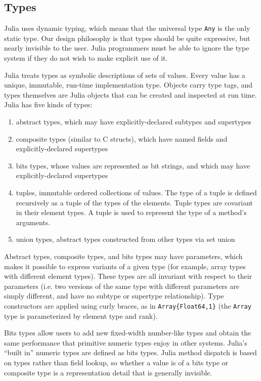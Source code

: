 \documentclass[9pt]{sigplanconf}
\begin{document}
\subsection{Types}

Julia uses dynamic typing, which means that the universal type {\tt Any}
is the only static type. Our design philosophy is that types should be
quite expressive, but nearly invisible to the user. Julia
programmers must be able to ignore the type system if they do
not wish to make explicit use of it.

Julia treats types as symbolic descriptions of sets of values. Every value has
a unique, immutable, run-time implementation type. Objects carry type tags, and
types themselves are Julia objects that can be created and inspected
at run time.
Julia has five kinds of types:

\begin{enumerate}
\item abstract types, which may have explicitly-declared subtypes and supertypes
\item composite types (similar to C structs), which have named fields and
      explicitly-declared supertypes
\item bits types, whose values are represented as bit strings, and which may
      have explicitly-declared supertypes
\item tuples, immutable ordered collections of values. The type of a tuple is
defined recursively as a tuple of the types of the elements. Tuple types are
covariant in their element types. A tuple is used to represent the type of a
method's arguments.
\item union types, abstract types constructed from other types via set union
\end{enumerate}

Abstract types, composite types, and bits types may have parameters, which
makes it possible to express variants of a given type (for example, array types
with different element types). These types are all invariant with respect to
their parameters (i.e. two versions of the same type with different parameters
are simply different, and have no subtype or supertype relationship). Type
constructors are applied using curly braces, as in {\tt Array\{Float64,1\}}
(the {\tt Array} type is parameterized by element type and rank).

Bits types allow users to add new fixed-width number-like types and obtain the
same performance that primitive numeric types enjoy in other systems. Julia's
``built in'' numeric types are defined as bits types. Julia method dispatch
is based on types rather than field lookup, so whether a value is of a bits
type or composite type is a representation detail that is generally
invisible.
\end{document}
